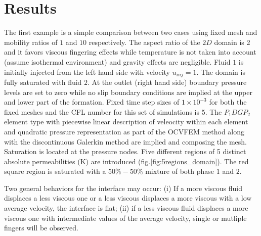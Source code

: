 \documentclass[preprint,authoryear,12pt]{elsarticle}
\begin{document}
\pagebreak
\clearpage
%
%

\section{Results}\label{section:results}

The first example is a simple comparison between two cases using fixed mesh and mobility ratios of $1$ and $10$ respectively. The aspect ratio of the $2D$ domain is 2 and it favors viscous fingering effects while temperature is not taken into account (assume isothermal environment) and gravity effects are negligible. Fluid $1$ is initially injected from the left hand side with velocity $u_{inj}=1$. The domain is fully saturated with fluid $2$. At the outlet (right hand side) boundary pressure levels are set to zero while no slip boundary conditions are implied at the upper and lower part of the formation. Fixed time step sizes of $1 \times 10^{-3}$ for both the fixed meshes and the CFL number for this set of simulations is 5. The $P_{1}DGP_{2}$ element type with piecewise linear description of veleocity within each element and quadratic pressure representation as part of the OCVFEM method along with the discontinuous Galerkin method are implied and composing the mesh. Saturation is located at the pressure nodes. Five different regions of 5 distinct absolute permeabilities (K) are introduced (fig.\ref{fig:5regions_domain}). The red square region is saturated with a $50\%-50\%$ mixture of both phase $1$ and $2$. 

Two general behaviors for the interface may occur: (i) If a more viscous fluid displaces a less viscous one or a less viscous displaces a more viscous with a low average velocity, the interface is flat; (ii) if a less viscous fluid displaces a more viscous one with intermediate values of the average velocity, single or mutliple fingers will be observed.
\end{document}
